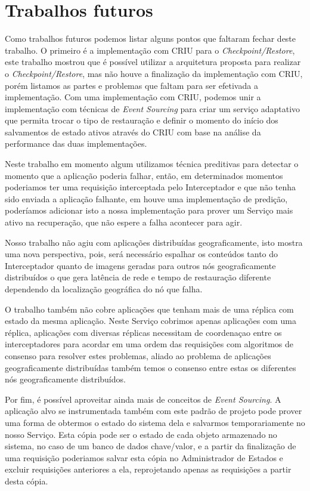 \section{Trabalhos futuros}

Como trabalhos futuros podemos listar alguns pontos que faltaram fechar deste trabalho.
O primeiro é a implementação com CRIU para o \textit{Checkpoint/Restore}, este trabalho
mostrou que é possível utilizar a arquitetura proposta para realizar o
\textit{Checkpoint/Restore}, mas não houve a finalização da implementação com CRIU,
porém listamos as partes e problemas que faltam para ser efetivada a implementação. Com
uma implementação com CRIU, podemos unir a implementação com técnicas de
\textit{Event Sourcing} para criar um serviço adaptativo que permita trocar o tipo de
restauração e definir o momento do início dos salvamentos de estado ativos através do
CRIU com base na análise da performance das duas implementações.

Neste trabalho em momento algum utilizamos técnica preditivas para detectar o momento
que a aplicação poderia falhar, então, em determinados momentos poderiamos ter uma
requisição interceptada pelo Interceptador e que não tenha sido enviada a aplicação
falhante, em \cite{tran2022proactive} houve uma implementação de predição, poderíamos
adicionar isto a nossa implementação para prover um Serviço mais ativo na recuperação,
que não espere a falha acontecer para agir.

Nosso trabalho não agiu com aplicações distribuídas geograficamente, isto mostra uma
nova perspectiva, pois, será necessário espalhar os conteúdos tanto do Interceptador
quanto de imagens geradas para outros nós geograficamente distribuídos o que gera
latência de rede e tempo de restauração diferente dependendo da localização geográfica
do nó que falha.

O trabalho também não cobre aplicações que tenham mais de uma réplica com estado da
mesma aplicação. Neste Serviço cobrimos apenas aplicações com uma réplica,
aplicações com diversas réplicas necessitam de coordenaçao entre os interceptadores
para acordar em uma ordem das requisições com algoritmos de consenso para resolver
estes problemas, aliado ao problema de aplicações geograficamente distribuídas
também temos o consenso entre estas os diferentes nós geograficamente distribuídos.

Por fim, é possível aproveitar ainda mais de conceitos de \textit{Event Sourcing}.
A aplicação alvo se instrumentada também com este padrão de projeto pode prover uma
forma de obtermos o estado do sistema dela e salvarmos temporariamente no nosso
Serviço. Esta cópia pode ser o estado de cada objeto armazenado no sistema, no caso
de um banco de dados chave/valor, e a partir da finalização de uma requisição poderiamos
salvar esta cópia no Administrador de Estados e excluir requisições anteriores a ela,
reprojetando apenas as requisições a partir desta cópia.
